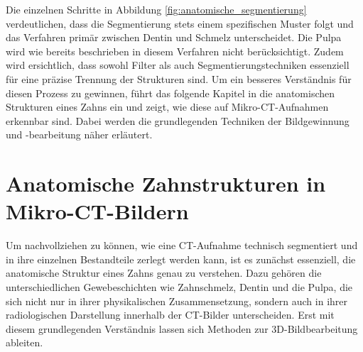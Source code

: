 Die einzelnen Schritte in Abbildung \ref{fig:anatomische_segmentierung}
verdeutlichen, dass die Segmentierung stets einem spezifischen Muster folgt und das
Verfahren primär zwischen Dentin und Schmelz unterscheidet. Die Pulpa wird wie
bereits beschrieben in diesem Verfahren nicht berücksichtigt. Zudem wird ersichtlich,
dass sowohl Filter als auch Segmentierungstechniken essenziell für eine präzise
Trennung der Strukturen sind. Um ein besseres Verständnis für diesen Prozess zu gewinnen,
führt das folgende Kapitel in die anatomischen Strukturen eines Zahns ein und
zeigt, wie diese auf Mikro-\ac{CT}-Aufnahmen erkennbar sind. Dabei werden die grundlegenden
Techniken der Bildgewinnung und -bearbeitung näher erläutert.

\pagebreak

\section{Anatomische Zahnstrukturen in Mikro-CT-Bildern}
\label{sec:domänenspezifisch} Um nachvollziehen zu können, wie eine \ac{CT}-Aufnahme
technisch segmentiert und in ihre einzelnen Bestandteile zerlegt werden kann,
ist es zunächst essenziell, die anatomische Struktur eines Zahns genau zu verstehen.
Dazu gehören die unterschiedlichen Gewebeschichten wie Zahnschmelz, Dentin und die
Pulpa, die sich nicht nur in ihrer physikalischen Zusammensetzung, sondern auch in
ihrer radiologischen Darstellung innerhalb der \ac{CT}-Bilder unterscheiden. Erst
mit diesem grundlegenden Verständnis lassen sich Methoden zur \ac{3D}-Bildbearbeitung
ableiten.

